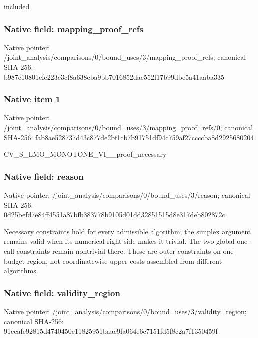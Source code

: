 \documentclass[10pt,a4paper]{article}
\begin{document}
\begingroup\raggedright\sloppy included\par\endgroup

\subsubsection{Native field: mapping\_\allowbreak{}proof\_\allowbreak{}refs}
Native pointer: /joint\_\allowbreak{}analysis/comparisons/0/bound\_\allowbreak{}uses/3/mapping\_\allowbreak{}proof\_\allowbreak{}refs; canonical SHA-256: b987e10801cfe223c3cf8a638eba9bb7016852dae552f17b99dbe5a41aaba335

\subsubsection{Native item 1}
Native pointer: /joint\_\allowbreak{}analysis/comparisons/0/bound\_\allowbreak{}uses/3/mapping\_\allowbreak{}proof\_\allowbreak{}refs/0; canonical SHA-256: fab8ae528737d43c877de2bf1cb7b91751df94c759af27ccccba8d2925680204

\begingroup\raggedright\sloppy CV\_\allowbreak{}S\_\allowbreak{}LMO\_\allowbreak{}MONOTONE\_\allowbreak{}VI\_\allowbreak{}\_\allowbreak{}proof\_\allowbreak{}necessary\par\endgroup

\subsubsection{Native field: reason}
Native pointer: /joint\_\allowbreak{}analysis/comparisons/0/bound\_\allowbreak{}uses/3/reason; canonical SHA-256: 0d25befd7e84ff4551a87bfb383778b9105d01dd32851515d8e317deb802872c

\begingroup\raggedright\sloppy Necessary constraints hold for every admissible algorithm;\allowbreak{} the simplex argument remains valid when its numerical right side makes it trivial. The two global one-call constraints remain nontrivial there. These are outer constraints on one budget region,\allowbreak{} not coordinatewise upper costs assembled from different algorithms.\par\endgroup

\subsubsection{Native field: validity\_\allowbreak{}region}
Native pointer: /joint\_\allowbreak{}analysis/comparisons/0/bound\_\allowbreak{}uses/3/validity\_\allowbreak{}region; canonical SHA-256: 91ccafe92815d4740450e11825951baac9fa064e6c7151fd5f8c2a7f1350459f
\end{document}
